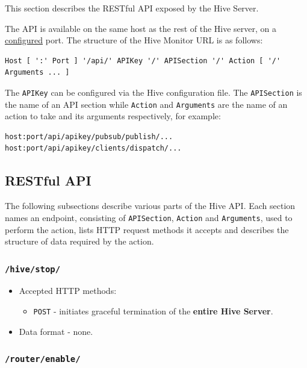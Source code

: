 \documentclass[a4paper]{article}
\begin{document}
This section describes the RESTful API exposed by the Hive Server.

\noindent
The API is available on the same host as the rest of the Hive server, on a \hyperref[ref-api-config]{configured} port. The structure of the Hive Monitor URL is as follows:


\begin{verbatim}
Host [ ':' Port ] '/api/' APIKey '/' APISection '/' Action [ '/' Arguments ... ]
\end{verbatim}




\noindent
The \texttt{APIKey} can be configured via the Hive configuration file. The \texttt{APISection} is the name of an API section while \texttt{Action} and \texttt{Arguments} are the name of an action to take and its arguments respectively, for example:


\begin{verbatim}
host:port/api/apikey/pubsub/publish/...
host:port/api/apikey/clients/dispatch/...
\end{verbatim}
\subsection{RESTful API}
\label{sec-6-1}

The following subsections describe various parts of the Hive API. Each section names an endpoint, consisting of \texttt{APISection}, \texttt{Action} and \texttt{Arguments}, used to perform the action, lists HTTP request methods it accepts and describes the structure of data required by the action.
\subsubsection{\texttt{/hive/stop/}}
\label{sec-6-1-1}
\label{ref-api_stop}


\begin{itemize}
\item Accepted HTTP methods:
\begin{itemize}
\item \texttt{POST} - initiates graceful termination of the \textbf{entire Hive Server}.
\end{itemize}
\item Data format - none.
\end{itemize}
\subsubsection{\texttt{/router/enable/}}
\label{sec-6-1-2}
\end{document}
